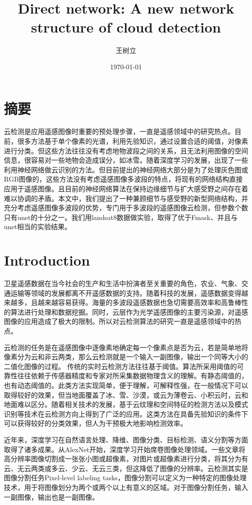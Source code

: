 \documentclass[UTF8]{ctexart}
\begin{document}
\title{Direct network: A new network structure of cloud detection}
\author{王树立}
\date{\today}

\maketitle
\section*{摘要}
云检测是应用遥感图像时重要的预处理步骤，一直是遥感领域中的研究热点。目前，很多方法基于单个像素的光谱，利用先验知识，通过设置合适的阈值，对像素进行分类。但这些方法往往没有考虑地物波段之间的关系，且无法利用图像的空间信息，很容易对一些地物会造成误分，如冰雪。随着深度学习的发展，出现了一些利用神经网络做云识别的方法。但目前提出的神经网络大部分是为了处理灰色图或RGB图像的，这些方法没有考虑遥感图像多波段的特点，将现有的网络结构直接应用于遥感图像。且目前的神经网络算法在保持边缘细节与扩大感受野之间存在着难以协调的矛盾。本文中，我们提出了一种兼顾细节与感受野的新型网络结构，并充分考虑遥感图像多波段的优势，专门用于多波段的遥感图像云检测，但参数个数只有unet的十分之一。我们用landsat8数据做实验，取得了优于Fmask、并且与unet相当的实验结果。

\section[]{Introduction}
卫星遥感数据在当今社会的生产和生活中扮演者至关重要的角色，农业、气象、交通运输等领域的发展都离不开遥感数据的支持。随着科技的发展，遥感数据变得越来越多，且越来越容易获得。海量的多波段遥感数据也急切需要高效率和高鲁棒性的算法进行处理和数据挖掘。同时，云层作为光学遥感图像的主要污染源，对遥感图像的应用造成了极大的限制。所以对云检测算法的研究一直是遥感领域中的热点。

云检测的任务是在遥感图像中逐像素地确定每一个像素点是否为云，若是简单地将像素分为云和非云两类，那么云检测就是一个输入一副图像，输出一个同等大小的二值化图像的过程。
传统的实时云检测方法往往基于阈值。算法所采用阈值的可靠性往往依赖于传感器精度和专家对所采集数据物理含义的理解。有静态阈值的，也有动态阈值的。此类方法实现简单，便于理解，可解释性强，在一般情况下可以取得较好的效果，但当地面覆盖了冰、雪、沙漠，或云为薄卷云、小积云时，云和地面难以区分。随着相关技术的发展，基于云纹理和空间特征的检测方法以及模式识别等技术在云检测方向上得到了广泛的应用。这类方法在具备先验知识的条件下可以获得较好的分类效果，但人为干预极大地影响检测效率。

近年来，深度学习在自然语言处理、降维、图像分类、目标检测、语义分割等方面取得了诸多成果。从AlexNet开始，深度学习开始席卷图像处理领域。一些文章将高分辨率图像切割成一张张小图或超像素，对图片或超像素进行分类，将其分为有云、无云两类或多云、少云、无云三类，但这降低了图像的分辨率。云检测其实是图像分割任务Pixel-level labeling tasks，图像分割可以定义为一种特定的图像处理技术，用于将图像划分为两个或两个以上有意义的区域。对于图像分割任务，输入一副图像，输出也是一副图像。
\end{document}
